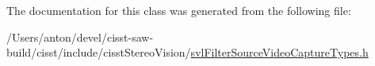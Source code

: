 The documentation for this class was generated from the following file\+:\begin{DoxyCompactItemize}
\item 
/\+Users/anton/devel/cisst-\/saw-\/build/cisst/include/cisst\+Stereo\+Vision/\hyperlink{svl_filter_source_video_capture_types_8h}{svl\+Filter\+Source\+Video\+Capture\+Types.\+h}\end{DoxyCompactItemize}

